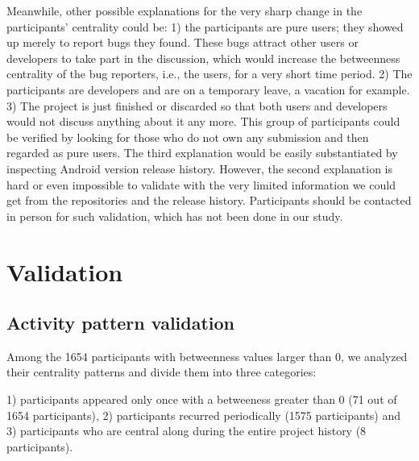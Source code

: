 \documentclass[10pt, conference, compsocconf]{IEEEtran}
\begin{document}
Meanwhile, other possible explanations for the very sharp change in
the participants' centrality could be: 1) the participants are pure
users; they showed up merely to report bugs they found. These bugs
attract other users or developers to take part in the discussion,
which would increase the betweenness centrality of the bug reporters,
i.e., the users, for a very short time period. 2) The participants are
developers and are on a temporary leave, a vacation for
example. 
3) The project is just
finished or discarded so that both users and developers would not
discuss anything about it any more. This group of participants could be
verified by looking for those who do not own any submission and then
regarded as pure users. 
The third explanation would be easily
substantiated by inspecting Android version release history. However,
the second explanation is hard or even impossible to validate with the
very limited information we could get from the repositories and the
release history. Participants should be contacted in person for such
validation, which has not been done in our study.




\section{Validation}
\label{validation}
\subsection{Activity pattern validation}

Among the 1654 participants with betweenness values larger than 0, we
analyzed their centrality patterns and divide them into three
categories: 

1) participants appeared only once with a betweeness greater than 0 (71 out of 1654
participants),
2) participants recurred periodically (1575 participants)
and 3) participants who are central along during the entire project
history (8 participants).
\end{document}
